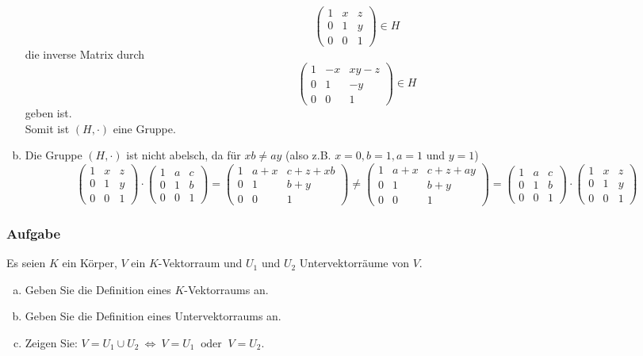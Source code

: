 \documentclass[a4paper,11pt]{scrartcl}
\newcounter{auf}
\newcommand{\Aufgabe}%
        {\addtocounter{auf}{1} \subsubsection*{\rmfamily  Aufgabe \theauf \hspace{1em}} }
\begin{document}
\begin{enumerate}[a)]
$$
 \begin{pmatrix} 1&x&z\\0&1&y\\0&0&1 \end{pmatrix} \in H
$$
die inverse Matrix durch
$$
 \begin{pmatrix} 1&-x&xy-z\\0&1&-y\\0&0&1 \end{pmatrix} \in H
$$
geben ist.\\
Somit ist $(H,\cdot)$ eine Gruppe.
\item Die Gruppe $(H,\cdot)$ ist nicht abelsch, da für $xb\ne ay$ (also z.B. $x=0,b=1,a=1$ und $y=1$)
$$
\begin{pmatrix} 1&x&z\\0&1&y\\0&0&1 \end{pmatrix} \cdot \begin{pmatrix} 1&a&c\\0&1&b\\0&0&1 \end{pmatrix} =\begin{pmatrix} 1&a+x&c+z+xb\\0&1&b+y\\0&0&1 \end{pmatrix}\ne \begin{pmatrix} 1&a+x&c+z+ay\\0&1&b+y\\0&0&1 \end{pmatrix}=\begin{pmatrix} 1&a&c\\0&1&b\\0&0&1 \end{pmatrix}\cdot \begin{pmatrix} 1&x&z\\0&1&y\\0&0&1 \end{pmatrix} 
$$
\end{enumerate}


\newpage
\Aufgabe

Es seien $K$ ein Körper, $V$ ein $K$-Vektorraum und $U_1$ und $U_2$
Untervektorräume von $V.$

\begin{enumerate}[a)]
\item Geben Sie die Definition eines $K$-Vektorraums an.
\item Geben Sie die Definition eines Untervektorraums an.
\item Zeigen Sie: $V=U_1\cup U_2  \ \Longleftrightarrow \ V=U_1\ \text{ oder }\ V=U_2.$
\end{enumerate}
\end{document}
